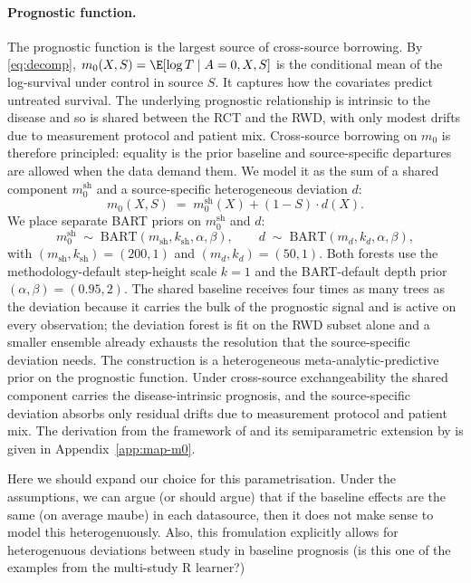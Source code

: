 \paragraph{Prognostic function.}
The prognostic function is the largest source of cross-source borrowing.
By \eqref{eq:decomp}, $m_0(X, S) = \E[\log T \mid A = 0, X, S]$ is the conditional mean of the log-survival under control in source $S$.
It captures how the covariates predict untreated survival.
The underlying prognostic relationship is intrinsic to the disease and so is shared between the RCT and the RWD, with only modest drifts due to measurement protocol and patient mix.
Cross-source borrowing on $m_0$ is therefore principled: equality is the prior baseline and source-specific departures are allowed when the data demand them.
We model it as the sum of a shared component $m_0^{\mathrm{sh}}$ and a source-specific heterogeneous deviation $d$:
\begin{equation}
m_0(X, S) \;=\; m_0^{\mathrm{sh}}(X) + (1 - S) \cdot d(X).
\label{eq:m0-decomp}
\end{equation}
We place separate BART priors on $m_0^{\mathrm{sh}}$ and $d$:
\begin{equation*}
m_0^{\mathrm{sh}} \;\sim\; \mathrm{BART}(m_{\mathrm{sh}}, k_{\mathrm{sh}}, \alpha, \beta), \qquad d \;\sim\; \mathrm{BART}(m_d, k_d, \alpha, \beta),
\end{equation*}
with $(m_{\mathrm{sh}}, k_{\mathrm{sh}}) = (200, 1)$ and $(m_d, k_d) = (50, 1)$.
Both forests use the methodology-default step-height scale $k = 1$ and the BART-default depth prior $(\alpha, \beta) = (0.95, 2)$.
The shared baseline receives four times as many trees as the deviation because it carries the bulk of the prognostic signal and is active on every observation; the deviation forest is fit on the RWD subset alone and a smaller ensemble already exhausts the resolution that the source-specific deviation needs.
The construction is a heterogeneous meta-analytic-predictive prior on the prognostic function.
Under cross-source exchangeability the shared component carries the disease-intrinsic prognosis, and the source-specific deviation absorbs only residual drifts due to measurement protocol and patient mix.
The derivation from the framework of \citet{neuenschwander2010} and its semiparametric extension by \citet{hupf2021bayesian} is given in Appendix~\ref{app:map-m0}.


Here we should expand our choice for this parametrisation. Under the assumptions, we can argue (or should argue) that if the baseline effects are the same (on average maube) in each datasource, then it does not make sense to model this heterogenuously. Also, this fromulation explicitly allows for heterogenuous deviations between study in baseline prognosis (is this one of the examples from the multi-study R learner?) 

